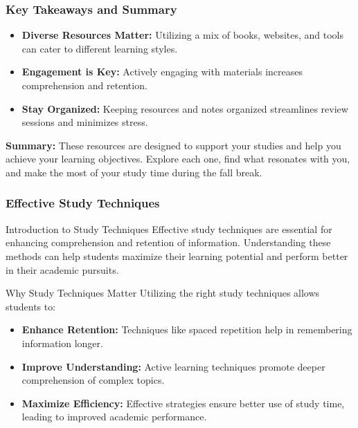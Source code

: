 \documentclass[aspectratio=169]{beamer}
\begin{document}
\begin{frame}[fragile]
    \frametitle{Key Takeaways and Summary}
    \begin{itemize}
        \item \textbf{Diverse Resources Matter:} Utilizing a mix of books, websites, and tools can cater to different learning styles.
        \item \textbf{Engagement is Key:} Actively engaging with materials increases comprehension and retention.
        \item \textbf{Stay Organized:} Keeping resources and notes organized streamlines review sessions and minimizes stress.
    \end{itemize}
    \vspace{0.5cm}
    \textbf{Summary:}
    These resources are designed to support your studies and help you achieve your learning objectives. Explore each one, find what resonates with you, and make the most of your study time during the fall break.
\end{frame}

\begin{frame}[fragile]
    \frametitle{Effective Study Techniques}
    \begin{block}{Introduction to Study Techniques}
        Effective study techniques are essential for enhancing comprehension and retention of information. Understanding these methods can help students maximize their learning potential and perform better in their academic pursuits.
    \end{block}
    
    \begin{block}{Why Study Techniques Matter}
        Utilizing the right study techniques allows students to:
        \begin{itemize}
            \item \textbf{Enhance Retention:} Techniques like spaced repetition help in remembering information longer.
            \item \textbf{Improve Understanding:} Active learning techniques promote deeper comprehension of complex topics.
            \item \textbf{Maximize Efficiency:} Effective strategies ensure better use of study time, leading to improved academic performance.
        \end{itemize}
    \end{block}
\end{frame}
\end{document}
